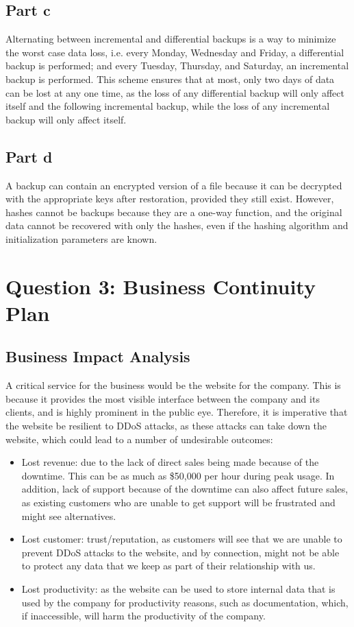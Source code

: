 \documentclass[12pt,a4paper]{article}
\begin{document}
\subsection{Part c}
Alternating between incremental and differential backups is a way to minimize the worst case data loss, i.e. every Monday, Wednesday and Friday, a differential backup is performed; and every Tuesday, Thursday, and Saturday, an incremental backup is performed. This scheme ensures that at most, only two days of data can be lost at any one time, as the loss of any differential backup will only affect itself and the following incremental backup, while the loss of any incremental backup will only affect itself.

\subsection{Part d}
A backup can contain an encrypted version of a file because it can be decrypted with the appropriate keys after restoration, provided they still exist. However, hashes cannot be backups because they are a one-way function, and the original data cannot be recovered with only the hashes, even if the hashing algorithm and initialization parameters are known.

\section{Question 3: Business Continuity Plan}
\subsection{Business Impact Analysis}
A critical service for the business would be the website for the company. This is because it provides the most visible interface between the company and its clients, and is highly prominent in the public eye. Therefore, it is imperative that the website be resilient to DDoS attacks, as these attacks can take down the website, which could lead to a number of undesirable outcomes:

\begin{itemize}
\item Lost revenue: due to the lack of direct sales being made because of the downtime. This can be as much as \$50,000 per hour during peak usage. In addition, lack of support because of the downtime can also affect future sales, as existing customers who are unable to get support will be frustrated and might see alternatives.
\item Lost customer: trust/reputation, as customers will see that we are unable to prevent DDoS attacks to the website, and by connection, might not be able to protect any data that we keep as part of their relationship with us.
  \item Lost productivity: as the website can be used to store internal data that is used by the company for productivity reasons, such as documentation, which, if inaccessible, will harm the productivity of the company.
\end{itemize}
\end{document}
